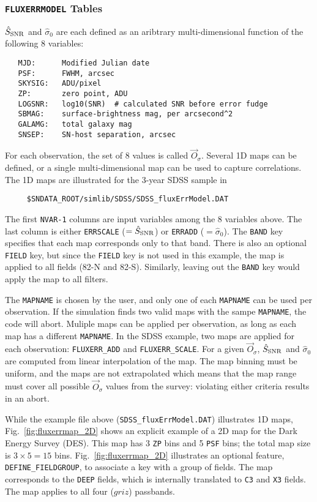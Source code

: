 \documentclass[12pt]{article}
\newcommand{\obs}{observation}
\newcommand{\sigOFF}{\hat\sigma_0}
\newcommand{\SSNR}{\hat{S}_{\rm SNR}}
\begin{document}
{%
\subsubsection{ {\tt FLUXERRMODEL} Tables }
\label{sss:fluxerrmap}

\newcommand{\obsvec}{\vec{O}_{\sigma}}

$\SSNR$ and $\sigOFF$ are each defined as an aribtrary
multi-dimensional function of the following 8 variables:
%
\begin{verbatim}
   MJD:      Modified Julian date
   PSF:      FWHM, arcsec
   SKYSIG:   ADU/pixel
   ZP:       zero point, ADU
   LOGSNR:   log10(SNR)  # calculated SNR before error fudge
   SBMAG:    surface-brightness mag, per arcsecond^2
   GALAMG:   total galaxy mag
   SNSEP:    SN-host separation, arcsec
\end{verbatim}
%
For each \obs, the set of 8 values is called $\obsvec$.
Several 1D maps can be defined, or a single multi-dimensional
map can be used to capture correlations. The 1D maps are
illustrated for the 3-year SDSS sample in
%
\begin{verbatim}
     $SNDATA_ROOT/simlib/SDSS/SDSS_fluxErrModel.DAT
\end{verbatim}
%
The first {\tt NVAR-1} columns are input variables among the
8 variables above. The last column is either
{\tt ERRSCALE} ($=\SSNR$) or {\tt ERRADD} ($=\sigOFF$).
The {\tt BAND} key specifies that each map corresponds
only to that band. There is also an optional {\tt FIELD}
key,  but since the {\tt FIELD} key is not used in this example, 
the map is applied to all fields (82-N and 82-S). 
Similarly, leaving out the {\tt BAND}
key would apply the map to all filters.

The {\tt MAPNAME} is chosen by the user, and only one of
each {\tt MAPNAME} can be used per \obs. If the simulation
finds two valid maps with the sampe {\tt MAPNAME}, the code
will abort.  Muliple maps can be applied per \obs, as long
as each map has a different {\tt MAPNAME}. In the SDSS example,
two maps are applied for each \obs:
{\tt FLUXERR\_ADD} and {\tt FLUXERR\_SCALE}.
For a given $\obsvec$, $\SSNR$ and $\sigOFF$ are computed
from linear interpolation of the map. The map binning must
be uniform, and the maps are not extrapolated which means that
the map range must cover all possible $\obsvec$ values 
from the survey: violating either criteria results in an abort.


While the example file above ({\tt SDSS\_fluxErrModel.DAT}) illustrates
1D maps, Fig.~\ref{fig:fluxerrmap_2D} shows an explicit example of a 
2D map for the Dark Energy Survey (DES).
This map has 3 {\tt ZP} bins and 5 {\tt PSF} bins;
the total map size is $3\times 5 = 15$ bins.
Fig.~\ref{fig:fluxerrmap_2D} illustrates an optional feature,
{\tt DEFINE\_FIELDGROUP}, to associate a key with a group of fields.
The map corresponds to the {\tt DEEP} fields, which is internally
translated to {\tt C3} and {\tt X3} fields. The map applies to all
four ($griz$) passbands.


}
\end{document}
